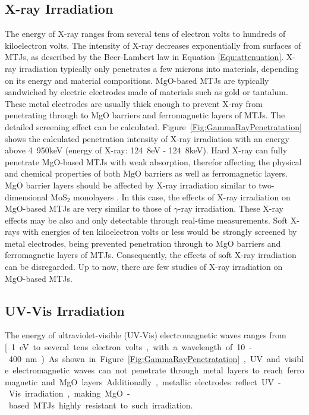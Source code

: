 \documentclass[molecules,review,submit,pdftex,moreauthors]{Definitions/mdpi}
\begin{document}
\subsection{X-ray Irradiation}


The energy of X-ray ranges from several tens of electron volts to hundreds of kiloelectron volts.  The intensity of X-ray decreases exponentially from surfaces of MTJs, as described by the Beer-Lambert law in Equation \ref{Equ:attenuation}.  X-ray irradiation typically only penetrates a few microns into materials, depending on its energy and material compositions.  MgO-based MTJs are typically sandwiched by electric electrodes made of materials such as gold or tantalum.  These metal electrodes are usually thick enough to prevent X-ray from penetrating through to MgO barriers and ferromagnetic layers of MTJs.   The detailed screening effect can be calculated.  Figure~\ref{Fig:GammaRayPenetratation} shows the calculated penetration intensity of X-ray irradiation with an energy above  \unit{4.950}{keV} (energy of X-ray: \unit{124.8}{eV} - \unit{124.8}{keV}).  Hard X-ray can fully penetrate MgO-based MTJs with weak absorption, therefor affecting the physical and chemical properties of both MgO barriers as well as ferromagnetic layers.  MgO barrier layers should be affected by X-ray irradiation similar to two-dimensional MoS$_2$ monolayers \cite{Zhao2019AS,Sze2022MM}. In this case, the effects of X-ray irradiation on MgO-based MTJs are very similar to those of $\gamma$-ray irradiation. These X-ray effects may be also  and only detectable through  real-time measurements.  Soft X-rays with energies of ten kiloelectron volts or less would be strongly screened by metal electrodes, being prevented penetration through to MgO barriers and ferromagnetic layers of MTJs.  Consequently, the effects of soft X-ray irradiation can be disregarded.  Up to now, there are few studies of X-ray irradiation on MgO-based MTJs.  


\subsection{UV-Vis Irradiation}


The energy of ultraviolet-visible (UV-Vis) electromagnetic waves ranges from \unit [{1}{eV} to several tens electron volts, with a wavelength of \unit{10 - 400}{nm}).  As shown in  Figure~\ref{Fig:GammaRayPenetratation}, UV and visible electromagnetic waves can not penetrate through metal layers to reach ferromagnetic and MgO layers.  Additionally, metallic electrodes reflect UV-Vis irradiation, making MgO-based MTJs highly resistant to such irradiation.  
\end{document}
